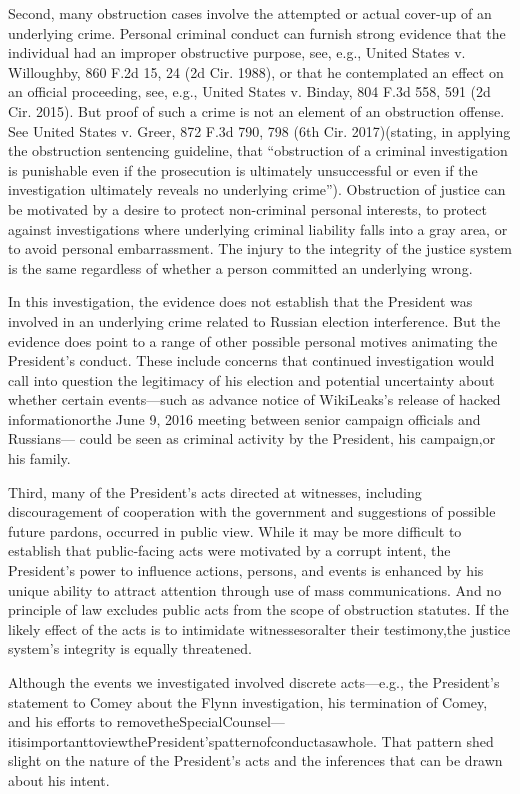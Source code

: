 {Second, many obstruction cases involve the attempted or actual cover-up of an underlying crime. Personal criminal conduct can furnish strong evidence that the individual had an improper obstructive purpose, see, e.g., United States v. Willoughby, 860 F.2d 15, 24 (2d Cir. 1988), or that he contemplated an effect on an official proceeding, see, e.g., United States v. Binday, 804 F.3d 558, 591 (2d Cir. 2015). But proof of such a crime is not an element of an obstruction offense. See United States v. Greer, 872 F.3d 790, 798 (6th Cir. 2017)(stating, in applying the obstruction sentencing guideline, that “obstruction of a criminal investigation is punishable even if the prosecution is ultimately unsuccessful or even if the investigation ultimately reveals no underlying crime”). Obstruction of justice can be motivated by a desire to protect non-criminal personal interests, to protect against investigations where underlying criminal liability falls into a gray area, or to avoid personal embarrassment. The injury to the integrity of the justice system is the same regardless of whether a person committed an underlying wrong.

In this investigation, the evidence does not establish that the President was involved in an underlying crime related to Russian election interference. But the evidence does point to a range of other possible personal motives animating the President's conduct. These include concerns that continued investigation would call into question the legitimacy of his election and potential uncertainty about whether certain events—such as advance notice of WikiLeaks's release of hacked informationorthe June 9, 2016 meeting between senior campaign officials and Russians— could be seen as criminal activity by the President, his campaign,or his family.

Third, many of the President's acts directed at witnesses, including discouragement of cooperation with the government and suggestions of possible future pardons, occurred in public view. While it may be more difficult to establish that public-facing acts were motivated by a corrupt intent, the President's power to influence actions, persons, and events is enhanced by his unique ability to attract attention through use of mass communications. And no principle of law excludes public acts from the scope of obstruction statutes. If the likely effect of the acts is to intimidate witnessesoralter their testimony,the justice system's integrity is equally threatened.

Although the events we investigated involved discrete acts—e.g., the President's statement to Comey about the Flynn investigation, his termination of Comey, and his efforts to removetheSpecialCounsel—itisimportanttoviewthePresident'spatternofconductasawhole. That pattern shed slight on the nature of the President's acts and the inferences that can be drawn about his intent.

}
